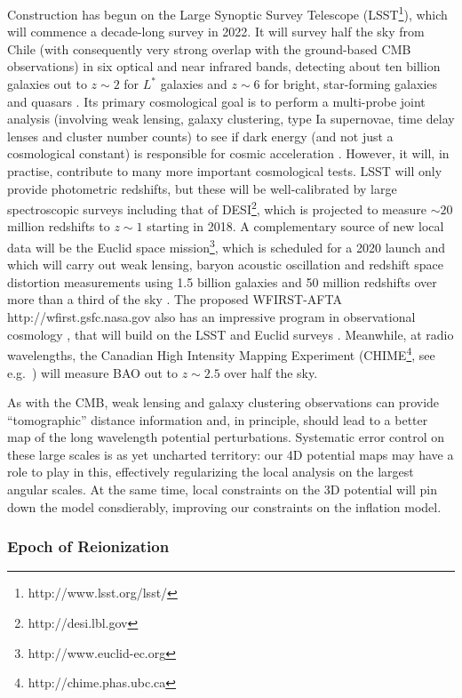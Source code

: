 \documentclass[psfig,11pt]{article}
\begin{document}
Construction has begun on the Large Synoptic Survey Telescope (LSST\footnote{http://www.lsst.org/lsst/}), which will commence a decade-long survey in 2022. It will survey half the sky from Chile (with consequently very strong overlap with the ground-based CMB observations) in six optical and near infrared bands, detecting about ten billion galaxies out to $z\sim2$ for $L^\ast$ galaxies and $z\sim6$ for bright, star-forming galaxies and quasars \cite{LSSTOverviewPaper}. Its primary cosmological goal is to perform a multi-probe joint analysis (involving weak lensing, galaxy clustering, type Ia supernovae, time delay lenses and cluster number counts) to see if dark energy (and not just a cosmological constant) is responsible for cosmic acceleration \cite{LSSTDESCWhitePaper}. However, it  will, in practise, contribute to many more important cosmological tests. LSST will only provide photometric redshifts, but these will be well-calibrated by large spectroscopic surveys including that of DESI\footnote{http://desi.lbl.gov}, which is projected to measure $\sim20$ million redshifts to $z\sim1$ starting in 2018. A complementary source of new local data will be the Euclid space mission\footnote{http://www.euclid-ec.org}, which is scheduled for a 2020 launch and which will carry out weak lensing, baryon acoustic oscillation and redshift space distortion measurements using 1.5 billion galaxies and 50 million redshifts over more than a third of the sky \cite{EuclidSciBook}. The proposed WFIRST-AFTA {http://wfirst.gsfc.nasa.gov} also has an impressive program in observational cosmology \cite{WFIRSTReport2015}, that will build on the LSST and Euclid surveys \cite{JainEtal2015}. Meanwhile, at radio wavelengths, the Canadian High Intensity Mapping Experiment (CHIME\footnote{http://chime.phas.ubc.ca}, see e.g.\ \cite{CHIME}) will measure BAO out to $z\sim2.5$ over half the sky.

As with the CMB, weak lensing and galaxy clustering observations can provide ``tomographic'' distance information and, in principle, should lead to a better map of the long wavelength potential perturbations. Systematic error control on these large scales is as yet uncharted territory: our 4D potential maps may have a role to play in this, effectively regularizing the local analysis on the largest angular scales. At the same time, local constraints on the 3D potential will pin down the  model consdierably, improving our constraints on the inflation model.


\subsubsection{Epoch of Reionization}
\end{document}
